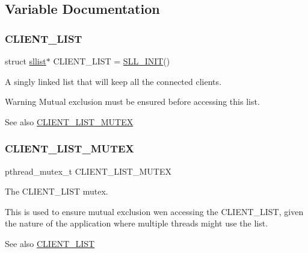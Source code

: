 \subsection{Variable Documentation}
\mbox{\label{zip-zop-server_8c_a32076dcdfaf1057a014d74d01cc7e08e}} 
\subsubsection{\texorpdfstring{C\+L\+I\+E\+N\+T\+\_\+\+L\+I\+ST}{CLIENT\_LIST}}
{\footnotesize\ttfamily struct \hyperlink{structsllist}{sllist}$\ast$ C\+L\+I\+E\+N\+T\+\_\+\+L\+I\+ST = \hyperlink{sllist_8h_a4f1348bb9eb6fe8c2b112e39c1887290}{S\+L\+L\+\_\+\+I\+N\+IT}()}



A singly linked list that will keep all the connected clients. 

\begin{DoxyWarning}{Warning}
Mutual exclusion must be ensured before accessing this list.
\end{DoxyWarning}
\begin{DoxySeeAlso}{See also}
\hyperlink{zip-zop-server_8c_ac58873310e66c9bfafdbc798a8a7c7e2}{C\+L\+I\+E\+N\+T\+\_\+\+L\+I\+S\+T\+\_\+\+M\+U\+T\+EX} 
\end{DoxySeeAlso}
\mbox{\label{zip-zop-server_8c_ac58873310e66c9bfafdbc798a8a7c7e2}} 
\subsubsection{\texorpdfstring{C\+L\+I\+E\+N\+T\+\_\+\+L\+I\+S\+T\+\_\+\+M\+U\+T\+EX}{CLIENT\_LIST\_MUTEX}}
{\footnotesize\ttfamily pthread\+\_\+mutex\+\_\+t C\+L\+I\+E\+N\+T\+\_\+\+L\+I\+S\+T\+\_\+\+M\+U\+T\+EX}



The {\ttfamily C\+L\+I\+E\+N\+T\+\_\+\+L\+I\+ST} mutex. 

This is used to ensure mutual exclusion wen accessing the {\ttfamily C\+L\+I\+E\+N\+T\+\_\+\+L\+I\+ST}, given the nature of the application where multiple threads might use the list.

\begin{DoxySeeAlso}{See also}
\hyperlink{zip-zop-server_8c_a32076dcdfaf1057a014d74d01cc7e08e}{C\+L\+I\+E\+N\+T\+\_\+\+L\+I\+ST} 
\end{DoxySeeAlso}
